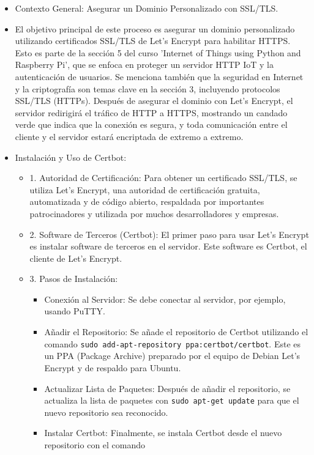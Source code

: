 \documentclass{report}
\begin{document}
\begin{itemize}
    \item Contexto General: Asegurar un Dominio Personalizado con SSL/TLS.
    \item El objetivo principal de este proceso es asegurar un dominio personalizado utilizando certificados SSL/TLS de Let's Encrypt 
    para habilitar HTTPS. Esto es parte de la sección 5 del curso 'Internet of Things using Python and Raspberry Pi', que se enfoca en proteger 
    un servidor HTTP IoT y la autenticación de usuarios. Se menciona también que la seguridad en Internet y la criptografía son temas 
    clave en la sección 3, incluyendo protocolos SSL/TLS (HTTPs). Después de asegurar el dominio con Let's Encrypt, el servidor redirigirá el 
    tráfico de HTTP a HTTPS, mostrando un candado verde que indica que la conexión es segura, y toda comunicación entre el cliente y el servidor 
    estará encriptada de extremo a extremo.
    \item Instalación y Uso de Certbot:
    \begin{itemize}
        \item 1. Autoridad de Certificación: Para obtener un certificado SSL/TLS, se utiliza Let's Encrypt, una autoridad de certificación 
        gratuita, automatizada y de código abierto, respaldada por importantes patrocinadores y utilizada por muchos desarrolladores y empresas.
        \item 2. Software de Terceros (Certbot): El primer paso para usar Let's Encrypt es instalar software de terceros en el servidor. 
        Este software es Certbot, el cliente de Let's Encrypt.
        \item 3. Pasos de Instalación:
        \begin{itemize}
            \item Conexión al Servidor: Se debe conectar al servidor, por ejemplo, usando PuTTY.
            \item Añadir el Repositorio: Se añade el repositorio de Certbot utilizando el comando \verb|sudo add-apt-repository ppa:certbot/certbot|. 
            Este es un PPA (Package Archive) preparado por el equipo de Debian Let's Encrypt y de respaldo para Ubuntu.
            \item Actualizar Lista de Paquetes: Después de añadir el repositorio, se actualiza la lista de paquetes con \verb|sudo apt-get update| 
            para que el nuevo repositorio sea reconocido.
            \item Instalar Certbot: Finalmente, se instala Certbot desde el nuevo repositorio con el comando 

\end{itemize}
\end{itemize}
\end{itemize}
\end{document}
